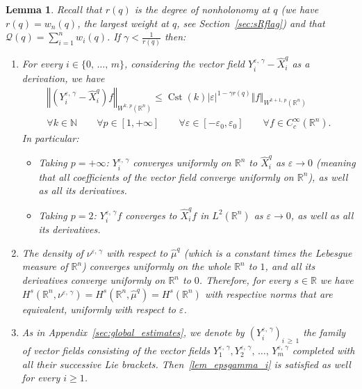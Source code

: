 \documentclass[10pt]{amsart}
\newtheorem{lemm}[theo]{Lemma}\newtheorem{prop}[theo]{Proposition}\newtheorem{coro}[theo]{Corollary}\newtheorem{conj}[theo]{Conjecture}
\theoremstyle{definition}\newtheorem{defi}[theo]{Definition}\newtheorem{rema}[theo]{Remark}\newtheorem{exam}[theo]{Example}\newtheorem{exem}[theo]{Example}\newtheorem{nota}[theo]{Notation}
\newcommand*\R{\mathbb{R}}
\newcommand*\N{\mathbb{N}}
\newcommand{\calQ}{\mathcal{Q}}
\DeclareMathOperator{\Cst}{Cst}
\renewcommand{\geq}{\geqslant}
\renewcommand{\leq}{\leqslant}
\newcommand*{\romanenumi}{\renewcommand*{\theenumi}{\roman{enumi}}}
\let\oldforall\forall
\renewcommand*{\forall}{\mathrel{\oldforall}}
\begin{document}
\begin{lemm}\label{lem_epsgamma}
Recall that $r(q)$ is the degree of nonholonomy at $q$ (we have $r(q)=w_n(q)$, the largest weight at $q$, see Section~\ref{sec:sRflag}) and that $\calQ(q)=\sum_{i=1}^n w_i(q)$. If $\gamma < \frac{1}{r(q)}$ then:
\begin{enumerate}\romanenumi
\item\label{lem_epsgamma_i}
For every $i\in\{0,\,\ldots,\,m\}$, considering the vector field $Y_i^{\varepsilon,\,\gamma} - \widehat{X}_i^{q}$ as a derivation, we have
\begin{multline*}
\left\Vert \left(Y_i^{\varepsilon,\,\gamma} - \widehat{X}_i^{q}\right)f \right\Vert_{W^{k,\,p}(\R^n)} \leq \Cst(k) \vert\varepsilon\vert^{1-\gamma r(q)} \Vert f\Vert_{W^{k+1,\,p}(\R^n)}\\
\forall k\in\N\qquad \forall p\in[1,+\infty]\qquad \forall \varepsilon\in[-\varepsilon_0,\varepsilon_0] \qquad \forall f\in C_c^\infty(\R^n).
\end{multline*}
In particular:
\begin{itemize}
\item Taking $p=+\infty$: $Y_i^{\varepsilon,\,\gamma}$ converges uniformly on $\R^n$ to $\widehat{X}_i^{q}$ as $\varepsilon\rightarrow 0$ (meaning that all coefficients of the vector field converge uniformly on $\R^n$), as well as all its derivatives.
\item Taking $p=2$: $Y_i^{\varepsilon,\,\gamma}f$ converges to $\widehat{X}_i^{q}f$ in $L^2(\R^n)$ as $\varepsilon\rightarrow 0$, as well as all its derivatives.
\end{itemize}

\item\label{lem_epsgamma_ii}
The density of $\nu^{\varepsilon,\,\gamma}$ with respect to $\widehat{\mu}^{q}$ (which is a constant times the Lebesgue measure of $\R^n$) converges uniformly on the whole $\R^n$ to $1$, and all its derivatives converge uniformly on $\R^n$ to $0$. Therefore, for every $s\in \R$ we have $H^s(\R^n,\nu^{\varepsilon,\,\gamma}) = H^s(\R^n,\widehat{\mu}^{q}) = H^s(\R^n)$ with respective norms that are equivalent, uniformly with respect to $\varepsilon$.

\item\label{lem_epsgamma_iii}
As in Appendix~\ref{sec:global_estimates}, we denote by $(Y_i^{\varepsilon,\,\gamma})_{i\,\geq\,1}$ the family of vector fields consisting of the vector fields $Y_1^{\varepsilon,\,\gamma}, Y_2^{\varepsilon,\,\gamma},\,\ldots,\,Y_m^{\varepsilon,\,\gamma}$ completed with all their successive Lie brackets. Then~\eqref{lem_epsgamma_i} is satisfied as well for every $i\geq 1$.


\end{enumerate}
\end{lemm}
\end{document}
